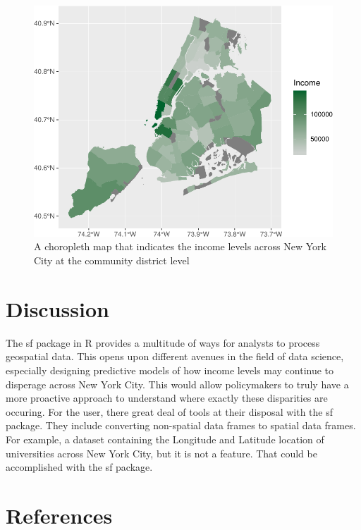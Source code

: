 \documentclass[man]{apa6}
\begin{document}
\begin{figure}

{\centering \includegraphics{KamalFinalPresentationPaper_files/figure-latex/unnamed-chunk-4-1} 

}

\caption{A choropleth map that indicates the income levels across New York City at the community district level}\label{fig:unnamed-chunk-4}
\end{figure}

\hypertarget{discussion}{%
\section{Discussion}\label{discussion}}

The sf package in R provides a multitude of ways for analysts to process geospatial data. This opens upon different avenues in the field of data science, especially designing predictive models of how income levels may continue to disperage across New York City. This would allow policymakers to truly have a more proactive approach to understand where exactly these disparities are occuring. For the user, there great deal of tools at their disposal with the sf package. They include converting non-spatial data frames to spatial data frames. For example, a dataset containing the Longitude and Latitude location of universities across New York City, but it is not a feature. That could be accomplished with the sf package.

\newpage

\hypertarget{references}{%
\section{References}\label{references}}
\end{document}
